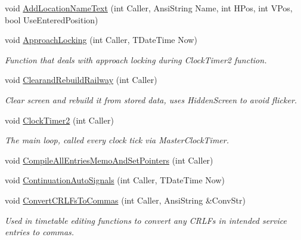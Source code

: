\begin{DoxyCompactItemize}
void \mbox{\hyperlink{class_t_interface_a27f00bc593500756b06fb2aeae9d28e1}{Add\+Location\+Name\+Text}} (int Caller, Ansi\+String Name, int H\+Pos, int V\+Pos, bool Use\+Entered\+Position)
\item 
\mbox{\label{class_t_interface_a0a89df44c20c9e2c096e66e2950c79a6}} 
void \mbox{\hyperlink{class_t_interface_a0a89df44c20c9e2c096e66e2950c79a6}{Approach\+Locking}} (int Caller, T\+Date\+Time Now)
\begin{DoxyCompactList}\small\item\em Function that deals with approach locking during Clock\+Timer2 function. \end{DoxyCompactList}\item 
\mbox{\label{class_t_interface_aaa05ac95703a25e1fb4863779854967c}} 
void \mbox{\hyperlink{class_t_interface_aaa05ac95703a25e1fb4863779854967c}{Clearand\+Rebuild\+Railway}} (int Caller)
\begin{DoxyCompactList}\small\item\em Clear screen and rebuild it from stored data, uses Hidden\+Screen to avoid flicker. \end{DoxyCompactList}\item 
\mbox{\label{class_t_interface_a6139ffb52492eb89e5487a8a3cd647b5}} 
void \mbox{\hyperlink{class_t_interface_a6139ffb52492eb89e5487a8a3cd647b5}{Clock\+Timer2}} (int Caller)
\begin{DoxyCompactList}\small\item\em The main loop, called every clock tick via Master\+Clock\+Timer. \end{DoxyCompactList}\item 
void \mbox{\hyperlink{class_t_interface_a330394a04433ce8672a52c2a0a659ff0}{Compile\+All\+Entries\+Memo\+And\+Set\+Pointers}} (int Caller)
\item 
void \mbox{\hyperlink{class_t_interface_abfdbbb1cf793f965f8c6ce60d4bb46ae}{Continuation\+Auto\+Signals}} (int Caller, T\+Date\+Time Now)
\item 
\mbox{\label{class_t_interface_a358336965e798e398258e67edbba1195}} 
void \mbox{\hyperlink{class_t_interface_a358336965e798e398258e67edbba1195}{Convert\+C\+R\+L\+Fs\+To\+Commas}} (int Caller, Ansi\+String \&Conv\+Str)
\begin{DoxyCompactList}\small\item\em Used in timetable editing functions to convert any C\+R\+L\+Fs in intended service entries to commas. \end{DoxyCompactList}\item 

\end{DoxyCompactItemize}

